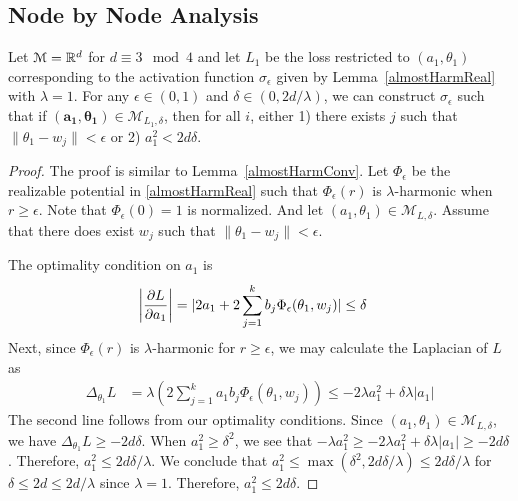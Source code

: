 \subsection{Node by Node Analysis}

\begin{lemma}\label{nodeConv}
Let $\mathcal{M} = {\mathbb{R}}^d$ for $d \equiv 3 \mod 4$ and let $L_1$ be the loss restricted to $(a_1,\theta_1)$ corresponding to the activation function $\sigma_\epsilon$ given by Lemma~\ref{almostHarmReal} with $\lambda = 1$. For any $\epsilon \in (0,1)$ and $\delta \in (0, 2d/\lambda)$, we can construct $\sigma_\epsilon$ such that if $\boldsymbol{(a_1,\theta_1)} \in \mathcal{M}_{L_1,\delta}$, then for all $i$, either 1) there exists $j$ such that $\|\theta_1 - w_j\| < \epsilon$ or 2) $a_1^2 < 2d\delta$.
\end{lemma}

\begin{proof}
The proof is similar to Lemma~\ref{almostHarmConv}. Let $\Phi_\epsilon$ be the realizable potential in \ref{almostHarmReal} such that $\Phi_\epsilon(r)$ is $\lambda$-harmonic when $r \geq \epsilon$. Note that $\Phi_\epsilon(0) = 1$ is normalized. And let $(a_1,\theta_1) \in \mathcal{M}_{L,\delta}$. Assume that there does exist $w_j$ such that $\|\theta_1 - w_j\| < \epsilon$. 
 
The optimality condition on ${ a_1}$ is
\begin{align*}
   \left| \frac{\partial L}{\partial a_1} \right| & = \lvert 2a_1  + 2\sum_{j=1}^k b_j \Phi_\epsilon(\theta_1,w_j) \rvert \leq \delta
\end{align*}
%
Next, since $\Phi_\epsilon(r)$ is $\lambda$-harmonic for $r \geq \epsilon$, we may calculate the Laplacian of $L$ as
%
\begin{align*}
\Delta_{\theta_1} L & = \lambda \left(2\sum_{j=1}^k a_1b_j
  \Phi_\epsilon(\theta_1, w_j) \right) 
 \leq  -2\lambda a_1^2 + \delta \lambda |a_1| 
\end{align*} 
%
The second line follows from our optimality conditions. Since ${(a_1,\theta_1)} \in \mathcal{M}_{L,\delta}$, we have $\Delta_{\theta_1} L \geq - 2d\delta$. When $a_1^2 \geq \delta^2$, we see that $-\lambda a_1^2 \geq -2 \lambda a_1^2 + \delta\lambda |a_1| \geq -2d\delta$. Therefore, $a_1^2 \leq 2d\delta/\lambda$. We conclude that $a_1^2 \leq \max(\delta^2, 2d\delta/\lambda) \leq 2d\delta/\lambda$ for $\delta\leq 2d \leq 2d/\lambda$ since $\lambda = 1$. Therefore, $a_1^2 \leq 2d\delta$.
\end{proof}

